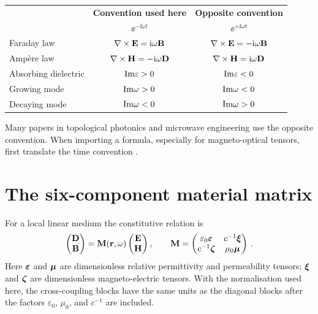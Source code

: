 \begin{center}
\begin{tabular}{lcc}
  \toprule
  & \textbf{Convention used here} & \textbf{Opposite convention} \\
  & $\ee^{-\ii\omega t}$ & $\ee^{+\ii\omega t}$ \\
  \midrule
  Faraday law & $\nabla\times\mathbf{E}=\mathrm{i}\omega\mathbf{B}$ &
    $\nabla\times\mathbf{E}=-\mathrm{i}\omega\mathbf{B}$ \\
  Amp\`ere law & $\nabla\times\mathbf{H}=-\mathrm{i}\omega\mathbf{D}$ &
    $\nabla\times\mathbf{H}=\mathrm{i}\omega\mathbf{D}$ \\
    Absorbing dielectric & $\mathrm{Im}\varepsilon>0$ & $\mathrm{Im}\varepsilon<0$ \\
  Growing mode & $\mathrm{Im}\omega>0$ & $\mathrm{Im}\omega<0$ \\
  Decaying mode & $\mathrm{Im}\omega<0$ & $\mathrm{Im}\omega>0$ \\
  \bottomrule
\end{tabular}
\end{center}

Many papers in topological photonics and microwave engineering use the
opposite convention.  When importing a formula, especially for
magneto-optical tensors, first translate the time convention
\cite{wang2007reflection}.

\section{The six-component material matrix}
\label{sec:appD-material-matrix}

For a local linear medium the constitutive relation is
\begin{equation}\label{eq:appD-constitutive}
  \begin{pmatrix}\mathbf{D}\\\mathbf{B}\end{pmatrix}
  =\mathbf{M}(\mathbf{r},\omega)
  \begin{pmatrix}\mathbf{E}\\\mathbf{H}\end{pmatrix},
  \qquad
  \mathbf{M}=\begin{pmatrix}
    \varepsilon_0\boldsymbol{\varepsilon} & c^{-1}\boldsymbol{\xi}\\
    c^{-1}\boldsymbol{\zeta} & \mu_0\boldsymbol{\mu}
  \end{pmatrix}\,.
\end{equation}
Here $\boldsymbol{\varepsilon}$ and $\boldsymbol{\mu}$ are dimensionless relative permittivity and
permeability tensors; $\boldsymbol{\xi}$ and $\boldsymbol{\zeta}$ are dimensionless
magneto-electric tensors.  With the normalisation used here, the
cross-coupling blocks have the same units as the diagonal blocks after
the factors $\varepsilon_0$, $\mu_0$, and $c^{-1}$ are included.

